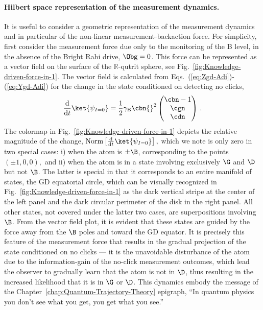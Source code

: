\paragraph{Hilbert space representation of the measurement dynamics.}

It is useful to consider a geometric representation of the measurement
dynamics and in particular of the non-linear measurement-backaction
force. For simplicity, first consider the measurement force due only
to the monitoring of the B level, in the absence of the Bright Rabi
drive, $\Obg=0$. This  force can be represented as a vector field
on the surface of the $\mathbb{R}$-qutrit sphere, see Fig.~\ref{fig:Knowledge-driven-force-in-1}.
The vector field is calculated from Eqs.~(\ref{eq:Zgd-Adi})-(\ref{eq:Ygd-Adi})
for the change in the state conditioned on detecting no clicks, 
\begin{equation}
\frac{\mathrm{d}}{\mathrm{d}t}\ket{\psi_{I=0}}=\frac{1}{2}\gamma_{{\rm B}}\cbn{}^{2}\begin{pmatrix}\cbn-1\\
\cgn\\
\cdn
\end{pmatrix}\,.\label{eq:ddtPsiI-vec}
\end{equation}
The colormap in Fig.~\ref{fig:Knowledge-driven-force-in-1} depicts
the relative magnitude of the change, $\mathrm{Norm}\left[\frac{\mathrm{d}}{\mathrm{d}t}\ket{\psi_{I=0}}\right],$
which we note is only zero in two special cases: i) when the atom
is $\pm\B$, corresponding to the points $\left(\pm1,0,0\right),$
and ii) when the atom is in a\emph{ }state involving exclusively $\G$
and $\D$ but not $\B$. The latter is special in that it corresponds
to an entire manifold of states, the GD equatorial circle, which can
be visually recognized in Fig.~\ref{fig:Knowledge-driven-force-in-1}
as the dark vertical stripe at the center of the left panel and the
dark circular perimeter of the disk in the right panel. All other
states, not covered under the latter two cases, are superpositions
involving $\B$. From the vector field plot, it is evident that these
states are guided by the force away from the $\B$ poles and toward
the GD equator. It is precisely this feature of the measurement force
that results in the gradual projection of the state conditioned on
no clicks — it is the unavoidable disturbance of the atom due to the
information-gain of the no-click measurement outcomes, which lead
the observer to gradually learn that the atom is not in $\D$, thus
resulting in the increased likelihood that it is in $\G$ or $\D$.
This dynamics embody the message of the Chapter~\ref{chap:Quantum-Trajectory-Theory}
epigraph, ``In quantum physics you don't see what you get, you get
what you see.''

